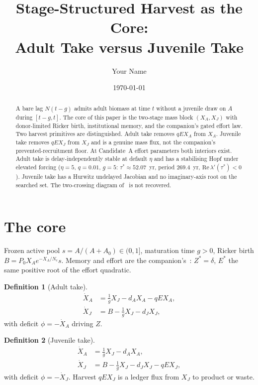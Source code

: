 \documentclass[11pt]{article}
\title{Stage-Structured Harvest as the Core:\\ Adult Take versus Juvenile Take}
\author{Your Name}
\date{\today}
\theoremstyle{definition}
\newtheorem{definition}{Definition}
\begin{document}
\maketitle

\begin{abstract}
A bare lag $N(t-g)$ admits adult biomass at time $t$ without a juvenile draw on $A$ during $[t-g,t]$. The core of this paper is the two-stage mass block $(X_A,X_J)$ with donor-limited Ricker birth, institutional memory, and the companion's gated effort law. Two harvest primitives are distinguished. Adult take removes $qEX_A$ from $X_A$. Juvenile take removes $qEX_J$ from $X_J$ and is a genuine mass flux, not the companion's prevented-recruitment floor. At Candidate~A effort parameters both interiors exist. Adult take is delay-independently stable at default $\eta$ and has a stabilising Hopf under elevated forcing ($\eta=5$, $q=0.01$, $g=5$: $\tau^*\approx 52.07$~yr, period $269.4$~yr, $\mathrm{Re}\,\lambda'(\tau^*)<0$). Juvenile take has a Hurwitz undelayed Jacobian and no imaginary-axis root on the searched set. The two-crossing diagram of~\cite{paperI} is not recovered.
\end{abstract}

\section{The core}

Frozen active pool $s=A/(A+A_0)\in(0,1]$, maturation time $g>0$, Ricker birth $B=P_0 X_A e^{-X_A/N_c}s$. Memory and effort are the companion's~\cite{paperI}: $Z^*=\delta$, $E^*$ the same positive root of the effort quadratic.

\begin{definition}[Adult take]
\label{def:adult}
\begin{equation}
\begin{aligned}
\dot X_A&=\frac1g X_J-d_A X_A-qEX_A,\\
\dot X_J&=B-\frac1g X_J-d_J X_J,
\end{aligned}
\label{eq:adult}
\end{equation}
with deficit $\phi=-\dot X_A$ driving $Z$.
\end{definition}

\begin{definition}[Juvenile take]
\label{def:juv}
\begin{equation}
\begin{aligned}
\dot X_A&=\frac1g X_J-d_A X_A,\\
\dot X_J&=B-\frac1g X_J-d_J X_J-qEX_J,
\end{aligned}
\label{eq:juv}
\end{equation}
with deficit $\phi=-\dot X_J$. Harvest $qEX_J$ is a ledger flux from $X_J$ to product or waste.
\end{definition}
\end{document}
